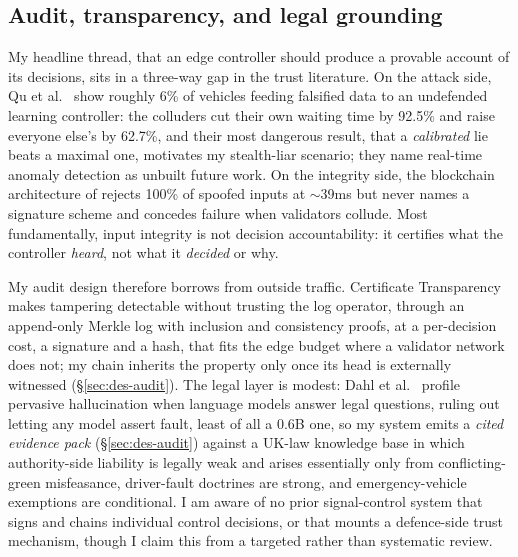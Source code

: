 \subsection{Audit, transparency, and legal grounding}\label{sec:bg-audit}

My headline thread, that an edge controller should produce a provable account of its decisions, sits in a three-way gap in the trust literature. On the attack side, Qu et al.\ \cite{collusion2021} show roughly 6\% of vehicles feeding falsified data to an undefended learning controller: the colluders cut their own waiting time by 92.5\% and raise everyone else's by 62.7\%, and their most dangerous result, that a \emph{calibrated} lie beats a maximal one, motivates my stealth-liar scenario; they name real-time anomaly detection as unbuilt future work. On the integrity side, the blockchain architecture of \cite{nonrepudiation2019} rejects 100\% of spoofed inputs at $\sim$39ms but never names a signature scheme and concedes failure when validators collude. Most fundamentally, input integrity is not decision accountability: it certifies what the controller \emph{heard}, not what it \emph{decided} or why.

My audit design therefore borrows from outside traffic. Certificate Transparency \cite{rfc6962} makes tampering detectable without trusting the log operator, through an append-only Merkle log with inclusion and consistency proofs, at a per-decision cost, a signature and a hash, that fits the edge budget where a validator network does not; my chain inherits the property only once its head is externally witnessed (\S\ref{sec:des-audit}). The legal layer is modest: Dahl et al.\ \cite{dahl2024legal} profile pervasive hallucination when language models answer legal questions, ruling out letting any model assert fault, least of all a 0.6B one, so my system emits a \emph{cited evidence pack} (\S\ref{sec:des-audit}) against a UK-law knowledge base in which authority-side liability is legally weak and arises essentially only from conflicting-green misfeasance, driver-fault doctrines are strong, and emergency-vehicle exemptions are conditional. I am aware of no prior signal-control system that signs and chains individual control decisions, or that mounts a defence-side trust mechanism, though I claim this from a targeted rather than systematic review.
